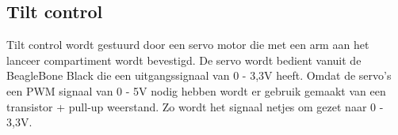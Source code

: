 \subsection{Tilt control}
\label{sub:tilt}
Tilt control wordt gestuurd door een servo motor die met een arm aan het lanceer
compartiment wordt bevestigd. De servo wordt bedient vanuit de BeagleBone Black die een
uitgangssignaal van 0 - 3,3V heeft. Omdat de servo's een PWM signaal van 0 - 5V nodig
hebben wordt er gebruik gemaakt van een transistor + pull-up weerstand. Zo wordt het
signaal netjes om gezet naar 0 - 3,3V.
